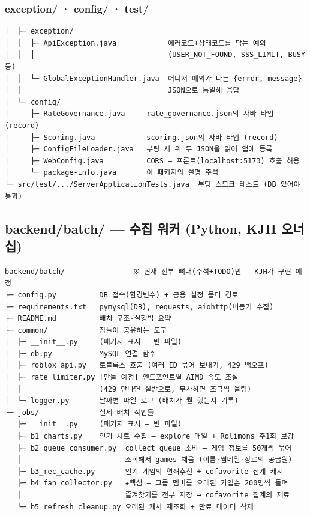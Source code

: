 \documentclass[11pt]{article}
\begin{document}
\subsubsection*{exception/ · config/ · test/}
\begin{Verbatim}[frame=single, fontsize=\small]
│  ├─ exception/
│  │  ├─ ApiException.java            에러코드+상태코드를 담는 예외
│  │  │                               (USER_NOT_FOUND, SSS_LIMIT, BUSY 등)
│  │  └─ GlobalExceptionHandler.java  어디서 예외가 나든 {error, message}
│  │                                  JSON으로 통일해 응답
│  └─ config/
│     ├─ RateGovernance.java     rate_governance.json의 자바 타입 (record)
│     ├─ Scoring.java            scoring.json의 자바 타입 (record)
│     ├─ ConfigFileLoader.java   부팅 시 위 두 JSON을 읽어 앱에 등록
│     ├─ WebConfig.java          CORS — 프론트(localhost:5173) 호출 허용
│     └─ package-info.java       이 패키지의 설명 주석
└─ src/test/.../ServerApplicationTests.java  부팅 스모크 테스트 (DB 있어야 통과)
\end{Verbatim}

\subsection{backend/batch/ --- 수집 워커 (Python, KJH 오너십)}
\begin{Verbatim}[frame=single, fontsize=\small]
backend/batch/                ※ 현재 전부 뼈대(주석+TODO)만 — KJH가 구현 예정
├─ config.py          DB 접속(환경변수) + 공용 설정 폴더 경로
├─ requirements.txt   pymysql(DB), requests, aiohttp(비동기 수집)
├─ README.md          배치 구조·실행법 요약
├─ common/            잡들이 공유하는 도구
│  ├─ __init__.py     (패키지 표시 — 빈 파일)
│  ├─ db.py           MySQL 연결 함수
│  ├─ roblox_api.py   로블록스 호출 (여러 ID 묶어 보내기, 429 백오프)
│  ├─ rate_limiter.py [만들 예정] 엔드포인트별 AIMD 속도 조절
│  │                  (429 만나면 절반으로, 무사하면 조금씩 올림)
│  └─ logger.py       날짜별 파일 로그 (배치가 뭘 했는지 기록)
└─ jobs/              실제 배치 작업들
   ├─ __init__.py     (패키지 표시 — 빈 파일)
   ├─ b1_charts.py    인기 차트 수집 — explore 매일 + Rolimons 주1회 보강
   ├─ b2_queue_consumer.py  collect_queue 소비 — 게임 정보를 50개씩 묶어
   │                        조회해서 games 채움 (이름·썸네일·장르의 공급원)
   ├─ b3_rec_cache.py       인기 게임의 연쇄추천 + cofavorite 집계 캐시
   ├─ b4_fan_collector.py   ★핵심 — 그룹 멤버를 오래된 가입순 200명씩 돌며
   │                        즐겨찾기를 전부 저장 → cofavorite 집계의 재료
   └─ b5_refresh_cleanup.py 오래된 캐시 재조회 + 만료 데이터 삭제
\end{Verbatim}
\end{document}

